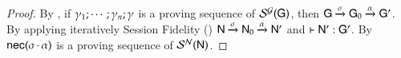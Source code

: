 \begin{proof}
By , if
  ${\gamma_1};\cdots;\gamma_n;\gamma$ is a proving sequence
  of $\mathcal{S}^{\mathcal{G}}({\sf G})$, then ${\sf G}\xrightarrow{\sigma}{\sf G}_0\xrightarrow{\alpha}{\sf G}'$.
By  applying iteratively  Session Fidelity ()
  ${\sf N}\xrightarrow{\sigma}{\sf N}_0\xrightarrow{\alpha}{\sf N}'$ and
  $\vdash {\sf N}' :{\sf G}'$.   By  %
  ${\sf nec}(\sigma\,{\cdot}\,\alpha)$ is a proving sequence of
  $\mathcal{S}^{\mathcal{N}}({\sf N})$. 
  \end{proof}


